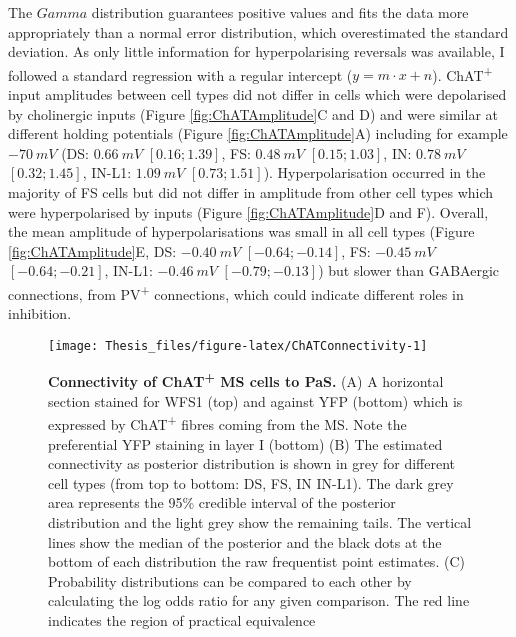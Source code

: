 \documentclass[
  12pt,
  a4paper,
  openany]{book}
\begin{document}
\noindent The \(Gamma\) distribution guarantees positive values and fits the data more appropriately than a normal error distribution, which overestimated the standard deviation. As only little information for hyperpolarising reversals was available, I followed a standard regression with a regular intercept (\(y = m \cdot x + n\)). ChAT\textsuperscript{+} input amplitudes between cell types did not differ in cells which were depolarised by cholinergic inputs (Figure \ref{fig:ChATAmplitude}C and D) and were similar at different holding potentials (Figure \ref{fig:ChATAmplitude}A) including for example \(-70\ mV\) (DS: \(0.66\ mV\) \([0.16; 1.39]\), FS: \(0.48\ mV\) \([0.15; 1.03]\), IN: \(0.78\ mV\) \([0.32; 1.45]\), IN-L1: \(1.09\ mV\) \([0.73; 1.51]\)). Hyperpolarisation occurred in the majority of FS cells but did not differ in amplitude from other cell types which were hyperpolarised by inputs (Figure \ref{fig:ChATAmplitude}D and F). Overall, the mean amplitude of hyperpolarisations was small in all cell types (Figure \ref{fig:ChATAmplitude}E, DS: \(-0.40\ mV\) \([-0.64; -0.14]\), FS: \(-0.45\ mV\) \([-0.64; -0.21]\), IN-L1: \(-0.46\ mV\) \([-0.79; -0.13]\)) but slower than GABAergic connections, from PV\textsuperscript{+} connections, which could indicate different roles in inhibition.

\FloatBarrier




\begin{figure}[H]

{\centering \texttt{[image: Thesis\_files/figure-latex/ChATConnectivity-1]} 

}

\caption[Connectivity of ChAT\textsuperscript{+} MS cells to PaS]{\textbf{Connectivity of ChAT\textsuperscript{+} MS cells to PaS.} (A) A horizontal section stained for WFS1 (top) and against YFP (bottom) which is expressed by ChAT\textsuperscript{+} fibres coming from the MS. Note the preferential YFP staining in layer I (bottom) (B) The estimated connectivity as posterior distribution is shown in grey for different cell types (from top to bottom: DS, FS, IN IN-L1). The dark grey area represents the 95\% credible interval of the posterior distribution and the light grey show the remaining tails. The vertical lines show the median of the posterior and the black dots at the bottom of each distribution the raw frequentist point estimates. (C) Probability distributions can be compared to each other by calculating the log odds ratio for any given comparison. The red line indicates the region of practical equivalence}\label{fig:ChATConnectivity}
\end{figure}
\end{document}
